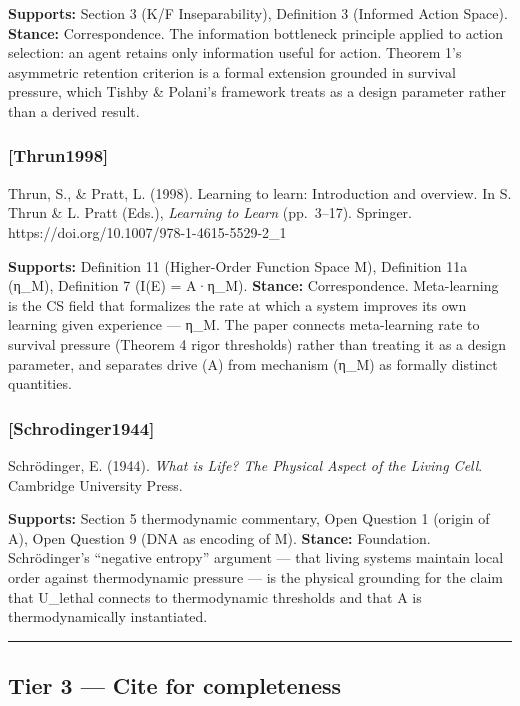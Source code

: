 \documentclass[
]{article}
\begin{document}
\textbf{Supports:} Section 3 (K/F Inseparability), Definition 3
(Informed Action Space). \textbf{Stance:} Correspondence. The
information bottleneck principle applied to action selection: an agent
retains only information useful for action. Theorem 1's asymmetric
retention criterion is a formal extension grounded in survival pressure,
which Tishby \& Polani's framework treats as a design parameter rather
than a derived result.

\subsubsection{{[}Thrun1998{]}}\label{thrun1998}

Thrun, S., \& Pratt, L. (1998). Learning to learn: Introduction and
overview. In S. Thrun \& L. Pratt (Eds.), \emph{Learning to Learn}
(pp.~3--17). Springer. https://doi.org/10.1007/978-1-4615-5529-2\_1

\textbf{Supports:} Definition 11 (Higher-Order Function Space M),
Definition 11a (η\_M), Definition 7 (I(E) = A·η\_M). \textbf{Stance:}
Correspondence. Meta-learning is the CS field that formalizes the rate
at which a system improves its own learning given experience --- η\_M.
The paper connects meta-learning rate to survival pressure (Theorem 4
rigor thresholds) rather than treating it as a design parameter, and
separates drive (A) from mechanism (η\_M) as formally distinct
quantities.

\subsubsection{{[}Schrodinger1944{]}}\label{schrodinger1944}

Schrödinger, E. (1944). \emph{What is Life? The Physical Aspect of the
Living Cell}. Cambridge University Press.

\textbf{Supports:} Section 5 thermodynamic commentary, Open Question 1
(origin of A), Open Question 9 (DNA as encoding of M). \textbf{Stance:}
Foundation. Schrödinger's ``negative entropy'' argument --- that living
systems maintain local order against thermodynamic pressure --- is the
physical grounding for the claim that U\_lethal connects to
thermodynamic thresholds and that A is thermodynamically instantiated.

\begin{center}\rule{0.5\linewidth}{0.5pt}\end{center}

\subsection{Tier 3 --- Cite for
completeness}\label{tier-3-cite-for-completeness}
\end{document}
